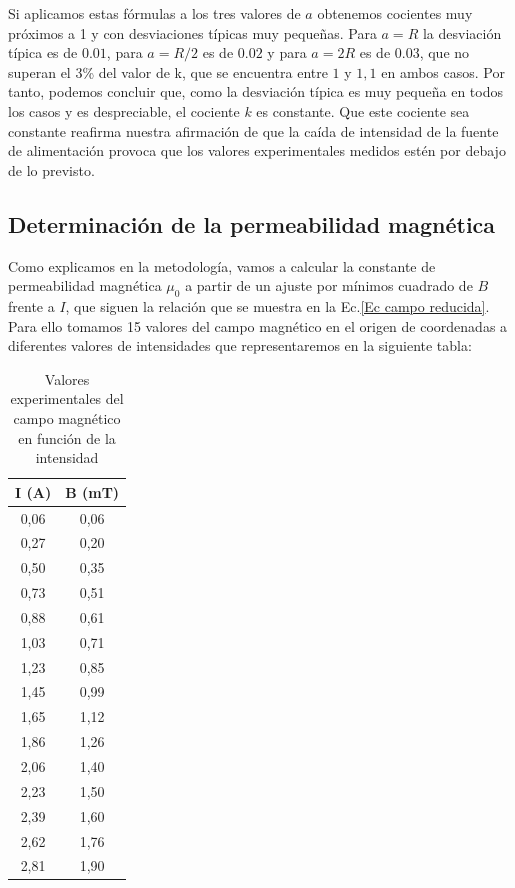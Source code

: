 \documentclass[a4paper,12pt,titlepage]{report}
\begin{document}
Si aplicamos estas fórmulas a los tres valores de $a$ obtenemos cocientes muy próximos a 1 y con desviaciones típicas muy pequeñas. Para $a=R$ la desviación típica es de $0.01$, para $a=R/2$ es de $0.02$ y para $a=2R$ es de $0.03$, que no superan el 3\% del valor de k, que se encuentra entre $1$ y $1,1$ en ambos casos. Por tanto, podemos concluir que, como la desviación típica es muy pequeña en todos los casos y es despreciable, el cociente $k$ es constante. Que este cociente sea constante reafirma nuestra afirmación de que la caída de intensidad de la fuente de alimentación provoca que los valores experimentales medidos estén por debajo de lo previsto.

\newpage

\subsection{Determinación de la permeabilidad magnética}

Como explicamos en la metodología, vamos a calcular la constante de permeabilidad magnética $\mu_0$ a partir de un ajuste por mínimos cuadrado de $B$ frente a $I$, que siguen la relación que se muestra en la Ec.\ref{Ec campo reducida}. Para ello tomamos 15 valores del campo magnético en el origen de coordenadas a diferentes valores de intensidades que representaremos en la siguiente tabla:

\begin{table}[h]
    \centering
    \begin{tabular}{|c|c|}
    \hline
    I (A) & B (mT) \\ \hline
    0,06  & 0,06   \\ \hline
    0,27  & 0,20    \\ \hline
    0,50   & 0,35   \\ \hline
    0,73  & 0,51   \\ \hline
    0,88  & 0,61   \\ \hline
    1,03  & 0,71   \\ \hline
    1,23  & 0,85   \\ \hline
    1,45  & 0,99   \\ \hline
    1,65  & 1,12   \\ \hline
    1,86  & 1,26   \\ \hline
    2,06  & 1,40    \\ \hline
    2,23  & 1,50   \\ \hline
    2,39  & 1,60    \\ \hline
    2,62  & 1,76   \\ \hline
    2,81  & 1,90    \\ \hline
    \end{tabular}
    \caption{Valores experimentales del campo magnético en función de la intensidad}
    \label{tab:my-table}
\end{table}
\end{document}
